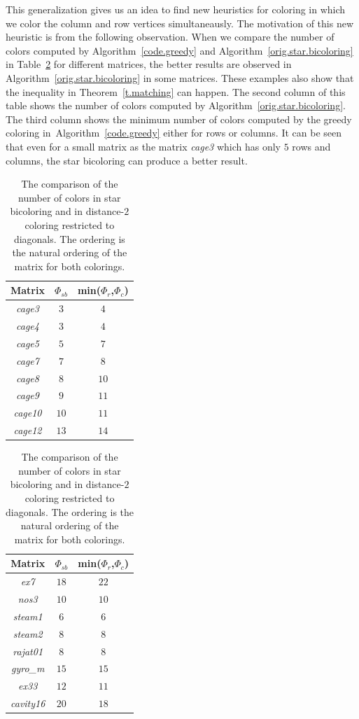 \documentclass[12pt, twoside,a4paper,toc=bibliography]{scrbook}
\newcommand{\coderef}[1]{Algorithm~\protect\ref{#1}}
\begin{document}
This generalization gives us an idea to find new heuristics for coloring in which
we color the column and row vertices simultaneausly.
The motivation of this new heuristic is from the following observation.
When we compare the number of colors computed by \coderef{code.greedy} and \coderef{orig.star.bicoloring}
in Table~\ref{table.starbic.d2.diag} for different matrices,
the better results are observed in \coderef{orig.star.bicoloring} in some matrices.
These examples also show that the inequality in Theorem~\ref{t.matching} can happen.
The second column of this table
shows the number of colors computed by \coderef{orig.star.bicoloring}.
The third column shows the minimum number of colors computed by the greedy coloring in~\coderef{code.greedy}
either for rows or columns.
It can be seen that even for a small matrix as the matrix \textit{cage3} which has only
$5$ rows and columns, the star bicoloring can produce a better result.

\begin{table}
\centering
\begin{tabular}{|c|c|c|}
\hline
Matrix & $\Phi_{sb}$ & min($\Phi_r$,$\Phi_c$)\\\hline
\textit{cage3} & $3$ & $4$\\\hline
\textit{cage4} & $3$ & $4$ \\\hline
\textit{cage5} & $5$ & $7$\\\hline
\textit{cage7} & $7$  & $8$\\\hline
\textit{cage8} & $8$  & $10$\\\hline
\textit{cage9} & $9$  & $11$\\\hline
\textit{cage10} & $10$ & $11$\\\hline
\textit{cage12} & $13$ &  $14$\\\hline
\end{tabular}
\hfill
\begin{tabular}{|c|c|c|}
\hline
Matrix & $\Phi_{sb}$ & min($\Phi_r$,$\Phi_c$)\\\hline
\textit{ex7} & $18$ & $22$ \\\hline
\textit{nos3} & $10$ & $10$ \\\hline
\textit{steam1} & $6$ & $6$ \\\hline
\textit{steam2} & $8$ & $8$ \\\hline
\textit{rajat01} & $8$ & $8$ \\\hline
\textit{gyro\_m} & $15$ & $15$\\\hline
\textit{ex33} & $12$ & $11$\\\hline
\textit{cavity16} & $20$ & $18$ \\\hline
\end{tabular}

\caption{The comparison of the number of colors in star bicoloring and in
distance-$2$ coloring restricted to diagonals.
The ordering is the natural ordering of the matrix for both colorings.}
\label{table.starbic.d2.diag}
\end{table}
\end{document}
